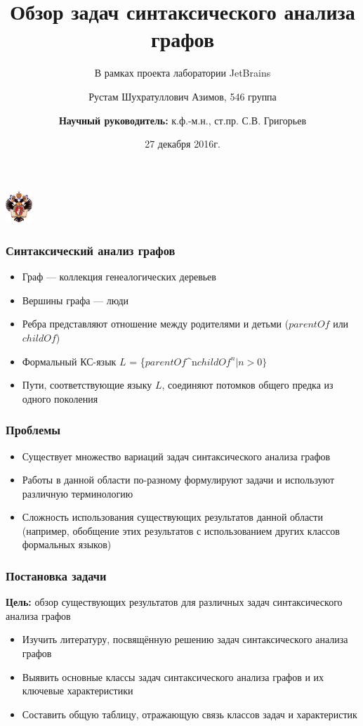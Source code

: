 \documentclass{beamer}
\title[]{Обзор задач синтаксического анализа графов}
\subtitle[]{В рамках проекта лаборатории JetBrains}
\institute[СПбГУ]{
Санкт-Петербургский государственный университет \\
Кафедра системного программирования }
\author[Рустам Азимов]{Рустам Шухратуллович Азимов, 546 группа \\
  \and  
    {\bfseries Научный руководитель:} к.ф.-м.н., ст.пр. С.В. Григорьев}
\date{27 декабря 2016г.}
\begin{document}
{
\begin{frame}
  \begin{center}
  {\includegraphics[width=1cm]{pictures/SPbGU_Logo.png}}
  \end{center}
  \titlepage
\end{frame}
}

\begin{frame}[fragile]
  \transwipe[direction=90]
  \frametitle{Синтаксический анализ графов}
  \begin{itemize}
    \item Граф --- коллекция генеалогических деревьев
    \item Вершины графа --- люди
    \item Ребра представляют отношение между родителями и детьми ($parentOf$ или $childOf$)
    \item Формальный КС-язык $L$ = \{$parentOf$^{n}$childOf^{n} | n > 0\}$
    \item Пути, соответствующие языку $L$, соединяют потомков общего предка из одного поколения
  \end{itemize}
\end{frame}

\begin{frame}[fragile]
	\transwipe[direction=90]
	\frametitle{Проблемы}
	\begin{itemize}
	    \item Существует множество вариаций задач синтаксического анализа графов
	    \item Работы в данной области по-разному формулируют задачи и используют различную терминологию
	    \item Сложность использования существующих результатов данной области (например, обобщение этих результатов с использованием других классов формальных языков)
    \end{itemize}
\end{frame}

            
\begin{frame}[fragile]
	\transwipe[direction=90]
	\frametitle{Постановка задачи}
	 \textbf{Цель:} обзор существующих результатов для различных задач синтаксического анализа графов
    \begin{itemize}
        \item Изучить литературу, посвящённую решению задач синтаксического анализа графов
        \item Выявить основные классы задач синтаксического анализа графов и их ключевые характеристики
        \item Составить общую таблицу, отражающую связь классов задач и характеристик
    \end{itemize}
\end{frame}
\end{document}

